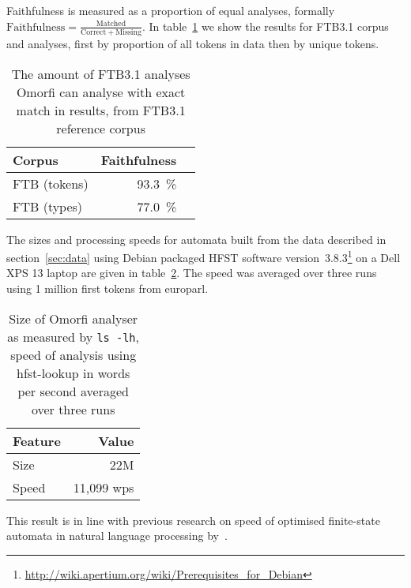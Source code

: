 \documentclass[a4paper,12pt]{article}
\begin{document}
Faithfulness is measured as a proportion of equal analyses, formally $\mathrm{Faithfulness} =
\frac{\mathrm{Matched}}{\mathrm{Correct} + \mathrm{Missing}}$. In
table~\ref{table:quality} we show the results for FTB3.1 corpus and
analyses, first by proportion of all tokens in data then by unique tokens.

\begin{table}
    \begin{scriptsize}
    \centering
    \begin{tabular}{|l|r|r|}
        \hline
        \bf Corpus & \bf Faithfulness \\
        \hline
        FTB (tokens) & 93.3~\% \\
        FTB (types)  & 77.0~\% \\
        \hline
    \end{tabular}
    \caption{The amount of FTB3.1 analyses Omorfi can analyse with exact
    match in results, from FTB3.1 reference corpus\label{table:quality}}
  \end{scriptsize}
\end{table}

The sizes and processing speeds for automata built from the data described in
section~\ref{sec:data} using Debian packaged HFST software
version~3.8.3\footnote{\url{http://wiki.apertium.org/wiki/Prerequisites_for_Debian}}
on a Dell XPS 13 laptop are given in table~\ref{table:size-speed}. The speed
was averaged over three runs using 1 million first tokens from europarl.

\begin{table}
    \begin{scriptsize}
        \centering
        \begin{tabular}{|l|r|}
            \hline
            \bf Feature & \bf Value \\
            \hline
            Size & 22M \\
            Speed & 11,099 wps\\
            \hline
        \end{tabular}
        \caption{Size of Omorfi analyser as measured by \texttt{ls -lh}, speed
        of analysis using hfst-lookup in words per second averaged over three runs
    \label{table:size-speed}}
    \end{scriptsize}
\end{table}

This result is in line with previous research on speed of optimised finite-state
automata in natural language processing by~\citet{silfverberg2009hfst}.
\end{document}
